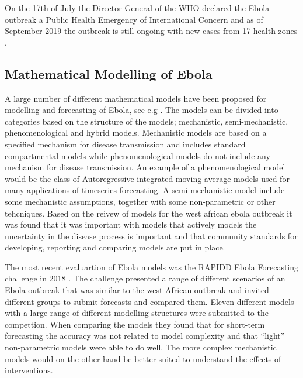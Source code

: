 \documentclass[12pt]{article}
\begin{document}
On the 17th of July the Director General of the WHO declared the Ebola outbreak a Public Health Emergency of International Concern \cite{worldhealthorganizationEbolaOutbreakDRC2019} and as of September 2019 the outbreak is still ongoing with new cases from 17 health zones \cite{worldhealthorganizationEbolaOutbreakDRC2019b}. 

\subsection{Mathematical Modelling of Ebola}

A large number of different mathematical models have been proposed for modelling and forecasting of Ebola, see e.g \cite{chretienMathematicalModelingWest,viboudRAPIDDEbolaForecasting2018}. The models can be divided into categories based on the structure of the models; mechanistic, semi-mechanistic, phenomenological and hybrid models. Mechanistic models are based on a specified mechanism for disease transmission and includes standard compartmental models while phenomenological models do not include any mechanism for disease transmission. An example of a phenomenological model would be the class of Autoregressive integrated moving average models used for many applications of timeseries forecasting. A semi-mechanistic model include some mechanistic assumptions, together with some non-parametric or other tehcniques. Based on the reivew of models for the west african ebola outbreak it was found that it was important with models that actively models the uncertainty in the disease process is important \cite{chretienMathematicalModelingWest, kingAvoidableErrorsModelling2015} and that community standards for developing, reporting and comparing models are put in place. 

The most recent evaluartion of Ebola models was the RAPIDD Ebola Forecasting challenge in 2018 \cite{viboudRAPIDDEbolaForecasting2018}. The challenge presented a range of different scenarios of an Ebola outbreak that was similar to the west African outbreak and invited different groups to submit forecasts and compared them. Eleven different models with a large range of different modelling structures were submitted to the compettion. When comparing the models they found that for short-term forecasting the accuracy was not related to model complexity and that ``light'' non-parametric models were able to do well. The more complex mechanistic models would on the other hand be better suited to understand the effects of interventions. 
\end{document}
